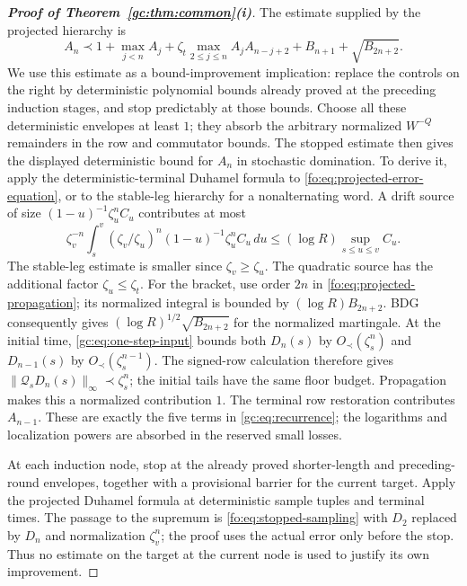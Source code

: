 \documentclass[11pt]{article}
\numberwithin{equation}{section}
\theoremstyle{remark}
\newcommand{\cQ}{\mathcal Q}
\begin{document}
\begin{proof}[\textbf{Proof of Theorem~\ref{gc:thm:common}(i)}]
The estimate supplied by the projected hierarchy is
\begin{equation}\label{gc:eq:recurrence}
 A_n\prec 1+\max_{j<n}A_j+
 \zeta_t\max_{2\le j\le n}A_jA_{n-j+2}
       +B_{n+1}+\sqrt{B_{2n+2}}.
\end{equation}
We use this estimate as a bound-improvement implication: replace the
controls on the right by deterministic polynomial bounds already proved
at the preceding induction stages, and stop predictably at those bounds.
Choose all these deterministic envelopes at least $1$; they absorb
the arbitrary normalized $W^{-Q}$ remainders in the row and commutator
bounds. The stopped estimate then gives the displayed deterministic
bound for $A_n$ in stochastic domination. To derive it, apply the deterministic-terminal Duhamel
formula to \eqref{fo:eq:projected-error-equation}, or to the stable-leg
hierarchy for a nonalternating word. A drift source of size
$(1-u)^{-1}\zeta_u^n C_u$ contributes at most
\[
 \zeta_v^{-n}\int_s^v(\zeta_v/\zeta_u)^n
            (1-u)^{-1}\zeta_u^n C_u\,du
 \le(\log R)\sup_{s\le u\le v}C_u.
\]
The stable-leg estimate is smaller since $\zeta_v\ge\zeta_u$.
The quadratic source has the additional factor $\zeta_u\le\zeta_t$.
For the bracket, use order $2n$ in
\eqref{fo:eq:projected-propagation}; its normalized integral is bounded
by $(\log R)B_{2n+2}$. BDG consequently gives
$(\log R)^{1/2}\sqrt{B_{2n+2}}$ for the normalized martingale.
At the initial time, \eqref{gc:eq:one-step-input} bounds both
$D_n(s)$ by $O_\prec(\zeta_s^n)$ and $D_{n-1}(s)$ by
$O_\prec(\zeta_s^{n-1})$. The signed-row calculation therefore gives
$\|\cQ_sD_n(s)\|_\infty\prec\zeta_s^n$; the initial tails have the
same floor budget. Propagation makes this a normalized contribution $1$.
The terminal row restoration contributes $A_{n-1}$.
These are exactly the five terms in
\eqref{gc:eq:recurrence}; the logarithms and localization powers are
absorbed in the reserved small losses.

At each induction node, stop at the already proved
shorter-length and preceding-round envelopes, together with a provisional
barrier for the current target. Apply the projected Duhamel formula at
deterministic sample tuples and terminal times. The passage to the
supremum is \eqref{fo:eq:stopped-sampling} with $D_2$ replaced by $D_n$
and normalization $\zeta_v^n$; the proof uses the actual error only
before the stop. Thus no estimate on the target at the current node
is used to justify its own improvement.


\end{proof}
\end{document}
